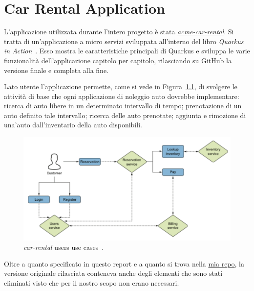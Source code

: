 \chapter{Car Rental Application}
L'applicazione utilizzata durante l'intero progetto è stata \href{https://github.com/xstefank/quarkus-in-action}{\textit{acme-car-rental}}. Si tratta di un'applicazione a micro servizi sviluppata all'interno del libro \textit{Quarkus in Action}~\cite{quarkusinaction}. Esso mostra le caratteristiche principali di Quarkus e sviluppa le varie funzionalità dell'applicazione capitolo per capitolo, rilasciando su GitHub la versione finale e completa alla fine.

Lato utente l'applicazione permette, come si vede in Figura~\ref{fig:use_cases}, di svolgere le attività di base che ogni applicazione di noleggio auto dovrebbe implementare: ricerca di auto libere in un determinato intervallo di tempo; prenotazione di un auto definito tale intervallo; ricerca delle auto prenotate; aggiunta e rimozione di una'auto dall'inventario della auto disponibili.
\begin{figure}[htbp]
    \centering
    \includegraphics[width=\textwidth]{images/2-car-rental/use cases.pdf}
    \caption{\textit{car-rental} users use cases~\cite{quarkusinaction}.}
    \label{fig:use_cases}
\end{figure}

\myskip

Oltre a quanto specificato in questo report e a quanto si trova nella \href{https://github.com/edoardosarri24/quarkus-car-rental}{mia repo}, la versione originale rilasciata conteneva anche degli elementi che sono stati eliminati visto che per il nostro scopo non erano necessari.

